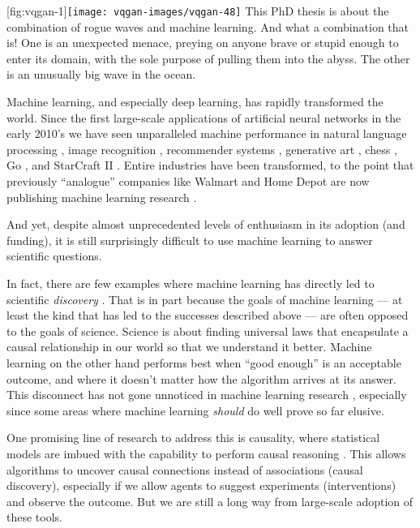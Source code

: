 \setcounter{chapter}{-1}

[fig:vqgan-1]{\texttt{[image: vqgan-images/vqgan-48]}}
%
This PhD thesis is about the combination of rogue waves and machine learning. And what a combination that is! One is an unexpected menace, preying on anyone brave or stupid enough to enter its domain, with the sole purpose of pulling them into the abyss. The other is an unusually big wave in the ocean.

Machine learning, and especially deep learning, has rapidly transformed the world. Since the first large-scale applications of artificial neural networks in the early 2010's we have seen unparalleled machine performance in natural language processing \citep{gpt3,bert}, image recognition \citep{alexnet}, recommender systems \citep{ma2020temporal}, generative art \citep[;][]{esser_taming_2021}, chess \citep{silver_mastering_2017}, Go \citep{silver_mastering_2016}, and StarCraft II \citep{vinyals_grandmaster_2019}. Entire industries have been transformed, to the point that previously \enquote{analogue} companies like Walmart and Home Depot are now publishing machine learning research \citep[\eg][]{xu_self-attention_2019,homedepot}.

And yet, despite almost unprecedented levels of enthusiasm in its adoption (and funding), it is still surprisingly difficult to use machine learning to answer scientific questions.

In fact, there are few examples where machine learning has directly led to scientific \emph{discovery} \citep{succi_big_2019}. That is in part because the goals of machine learning --- at least the kind that has led to the successes described above --- are often opposed to the goals of science. Science is about finding universal laws that encapsulate a causal relationship in our world so that we understand it better. Machine learning on the other hand performs best when \enquote{good enough} is an acceptable outcome, and where it doesn't matter how the algorithm arrives at its answer. This disconnect has not gone unnoticed in machine learning research \citep{marcus_deep_2022}, especially since some areas where machine learning \emph{should} do well \citep[like driverless cars or medical diagnoses,][]{varoquaux2021failed} prove so far elusive.

One promising line of research to address this is causality, where statistical models are imbued with the capability to perform causal reasoning \citep[see \eg][]{runge_inferring_2019}. This allows algorithms to uncover causal connections instead of associations (causal discovery), especially if we allow agents to suggest experiments (interventions) and observe the outcome. But we are still a long way from large-scale adoption of these tools.

